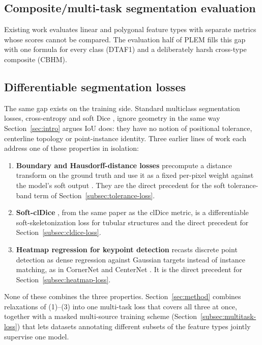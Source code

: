 \subsection{Composite/multi-task segmentation evaluation}
Existing work evaluates linear and polygonal feature types with separate metrics whose scores
cannot be compared. The evaluation half of PLEM fills this gap with one formula for every class
(DTAF1) and a deliberately harsh cross-type composite (CBHM).

\subsection{Differentiable segmentation losses}
\label{subsec:related-losses}
The same gap exists on the training side. Standard multiclass segmentation losses, cross-entropy
and soft Dice \cite{milletari2016vnet}, ignore geometry in the same way Section~\ref{sec:intro}
argues IoU does: they have no notion of positional tolerance, centerline topology or
point-instance identity. Three earlier lines of work each address one of these properties in
isolation:
\begin{enumerate}
  \item \textbf{Boundary and Hausdorff-distance losses} precompute a distance transform on the
    ground truth and use it as a fixed per-pixel weight against the model's soft output
    \cite{kervadec2019boundary,karimi2019hausdorff}. They are the direct precedent for the soft
    tolerance-band term of Section~\ref{subsec:tolerance-loss}.
  \item \textbf{Soft-clDice} \cite{shit2021cldice}, from the same paper as the clDice metric, is a
    differentiable soft-skeletonization loss for tubular structures and the direct precedent for
    Section~\ref{subsec:cldice-loss}.
  \item \textbf{Heatmap regression for keypoint detection} recasts discrete point detection as
    dense regression against Gaussian targets instead of instance matching, as in CornerNet
    \cite{law2018cornernet} and CenterNet \cite{zhou2019centernet}. It is the direct precedent for
    Section~\ref{subsec:heatmap-loss}.
\end{enumerate}
None of these combines the three properties. Section~\ref{sec:method} combines relaxations of
(1)--(3) into one multi-task loss that covers all three at once, together with a masked
multi-source training scheme (Section~\ref{subsec:multitask-loss}) that lets datasets annotating
different subsets of the feature types jointly supervise one model.
